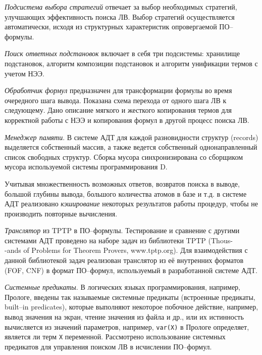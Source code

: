 \documentclass[a4paper]{report}
\begin{document}
\emph{Подсистема выбора стратегий} отвечает за выбор необходимых стратегий, улучшающих эффективность поиска ЛВ. Выбор стратегий осуществляется автоматически, исходя из структурных характеристик опровергаемой ПО--формулы. %

\emph{Поиск ответных подстановок} включает в себя три подсистемы: хранилище подстановок, алгоритм композиции подстановок и алгоритм унификации термов с учетом НЭЭ.

\emph{Обработчик формул} предназначен для трансформации формулы во время очередного шага вывода. Показана схема перехода от одного шага ЛВ к следующему. Дано описание мягкого и жесткого копирования термов для корректной работы с НЭЭ и копирования формул в другой процесс поиска ЛВ.

\emph{Менеджер памяти}. В системе АДТ для каждой разновидности структур (records) выделяется собственный массив, а также ведется собственный однонаправленный список свободных структур. Сборка мусора синхронизирована со сборщиком мусора используемой системы программирования D.

Учитывая множественность возможных ответов, возвратов поиска в выводе, большой глубины вывода, большого количества атомов в базе и т.д. в системе АДТ реализовано \emph{кэширование} некоторых результатов работы процедур, чтобы не производить повторные вычисления.

\emph{Транслятор} из TPTP в ПО--формулы. Тестирование и сравнение с другими системами АДТ проведено на наборе задач из библиотеки TPTP (Thous-\\-ands of Problems for Theorem Provers, www.tptp.org). Для взаимодействия с данной библиотекой задач реализован транслятор из её внутренних форматов (FOF, CNF) в формат ПО--формул, используемый в разработанной системе АДТ.

\emph{Системные предикаты}. В логических языках программирования, например, Прологе, введены так называемые системные предикаты (встроенные предикаты, built--in predicates), которые выполняют некоторое побочное действие, например, вывод значения на экран, чтение значения из файла и др., или их истинность вычисляется из значений параметров, например, \texttt{var(X)} в Прологе определяет, является ли терм \texttt{X} переменной. Рассмотрено использование системных предикатов для управления поиском ЛВ в исчислении ПО--формул.
\end{document}
